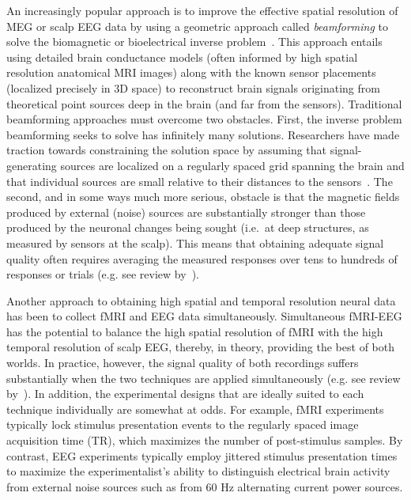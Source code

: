 An increasingly popular approach is to improve the effective spatial resolution
of MEG or scalp EEG data by using a geometric approach called
\textit{beamforming} to solve the biomagnetic or bioelectrical inverse
problem~\cite{Sarv87}.  This approach entails using detailed brain
conductance models (often informed by high spatial resolution
anatomical MRI images) along with the known sensor placements
(localized precisely in 3D space) to reconstruct brain signals
originating from theoretical point sources deep in the brain (and far
from the sensors).  Traditional beamforming approaches must overcome
two obstacles.  First, the inverse problem beamforming seeks to solve
has infinitely many solutions.  Researchers have made traction towards
constraining the solution space by assuming that signal-generating
sources are localized on a regularly spaced grid spanning the brain
and that individual sources are small relative to their distances to
the sensors~\cite{Snyd91, BailEtal01, HillEtal05}.  The second, and in
some ways much more serious, obstacle is that the magnetic fields
produced by external (noise) sources are substantially stronger than
those produced by the neuronal changes being sought (i.e.\ at deep structures, as measured by sensors at the scalp).  This means that
obtaining adequate signal quality often requires averaging the measured
responses over tens to hundreds of responses or trials (e.g. see
review by~\cite{HillEtal05}).

Another approach to obtaining high spatial and temporal resolution
neural data has been to collect fMRI and EEG data simultaneously.
Simultaneous fMRI-EEG has the potential to balance the high spatial
resolution of fMRI with the high temporal resolution of scalp EEG,
thereby, in theory, providing the best of both worlds.  In practice,
however, the signal quality of both recordings suffers substantially
when the two techniques are applied simultaneously (e.g. see review
by~\cite{HustEtal12}).  In addition, the experimental designs that are
ideally suited to each technique individually are somewhat at odds.
For example, fMRI experiments typically lock stimulus presentation
events to the regularly spaced image acquisition time (TR), which
maximizes the number of post-stimulus samples.  By contrast, EEG
experiments typically employ jittered stimulus presentation times to
maximize the experimentalist's ability to distinguish electrical brain
activity from external noise sources such as from 60 Hz alternating
current power sources.

